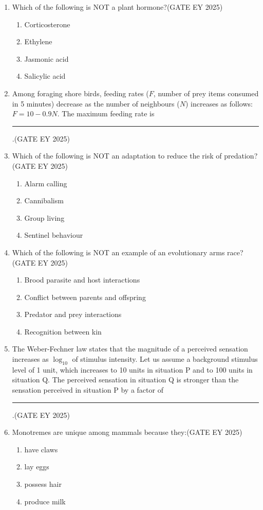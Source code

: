 \begin{enumerate}[leftmargin=*,label=\textbf{Q.\arabic*},resume]
\item Which of the following is NOT a plant hormone?\hfill {(GATE EY 2025)}
\begin{enumerate}
\item Corticosterone
\item Ethylene
\item Jasmonic acid
\item Salicylic acid
\end{enumerate}

\item Among foraging shore birds, feeding rates ($F$, number of prey items consumed in 5 minutes) decrease as the number of neighbours ($N$) increases as follows: $F = 10 - 0.9 N$. The maximum feeding rate is \rule{2cm}{0.15mm}.\hfill {(GATE EY 2025)}

\item Which of the following is NOT an adaptation to reduce the risk of predation?\hfill {(GATE EY 2025)}
\begin{enumerate}
\item Alarm calling
\item Cannibalism
\item Group living
\item Sentinel behaviour
\end{enumerate}

\item Which of the following is NOT an example of an evolutionary arms race?\hfill {(GATE EY 2025)}
\begin{enumerate}
\item Brood parasite and host interactions
\item Conflict between parents and offspring
\item Predator and prey interactions
\item Recognition between kin
\end{enumerate}

\item The Weber-Fechner law states that the magnitude of a perceived sensation increases as $\log_{10}$ of stimulus intensity. Let us assume a background stimulus level of 1 unit, which increases to 10 units in situation P and to 100 units in situation Q. The perceived sensation in situation Q is stronger than the sensation perceived in situation P by a factor of \rule{2cm}{0.15mm}.\hfill {(GATE EY 2025)}

\item Monotremes are unique among mammals because they:\hfill {(GATE EY 2025)}
\begin{multicols}{2}
\begin{enumerate}
\item have claws
\item lay eggs
\item possess hair
\item produce milk
\end{enumerate}
\end{multicols}
\end{enumerate}
